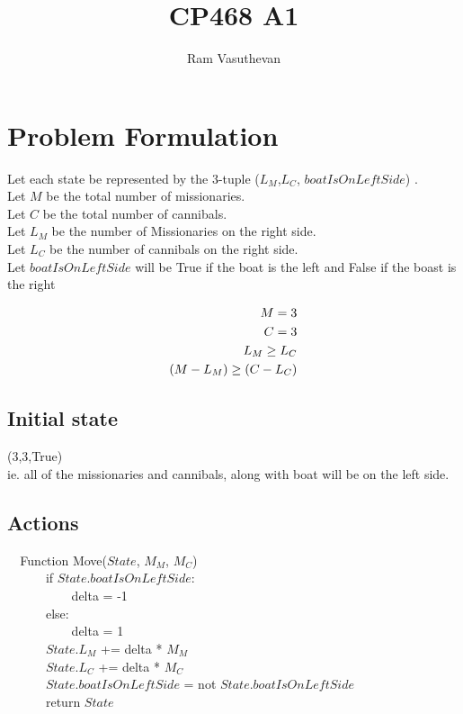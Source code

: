 \documentclass{article}
\title{CP468 A1}
\author{Ram Vasuthevan}
\begin{document}
\maketitle
\newpage

\section{Problem Formulation}

Let each state be represented by the 3-tuple  ($L_M$,$L_C$, $boatIsOnLeftSide$) . \\

\noindent 
Let $M$ be the total number of missionaries.\\
Let $C$ be the total number of cannibals.\\
Let $L_M$ be the number of Missionaries on the right side.\\
Let $L_C$ be the number of cannibals on the right side.\\
Let $boatIsOnLeftSide$ will be True if the boat is the left and False if the boast is the right

\hfill \break
\begin{align}
    \noindent
    M = 3\\
    C = 3\\
    L_M \geq L_C \\
    (M-L_M) \geq (C-L_C)\\
\end{align}

\subsection{Initial state}
    (3,3,True) \\
    ie. all of the missionaries and cannibals, along with boat will be on the left side.
    
\subsection{Actions}
    
\verb|  |Function Move($State$, $M_M$, $M_C$)\\
\verb|      |if $State.boatIsOnLeftSide$:\\
\verb|          |delta = -1\\
\verb|      |else:\\
\verb|          |delta = 1\\

\noindent    
\verb|      |$State.L_M$ += delta * $M_M$\\
\verb|      |$State.L_C$ += delta * $M_C$\\
\verb|      |$State.boatIsOnLeftSide$ = not $State.boatIsOnLeftSide$\\
\verb|      |return $State$\\
    
\end{document}
